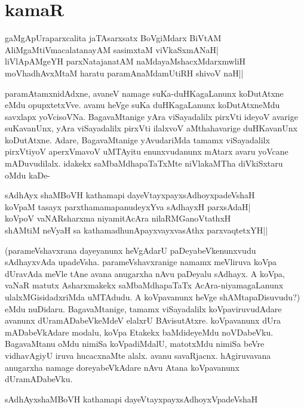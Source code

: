 \chapter{kamaR}\label{chap5}

\begin{shloka}
gaMgApUraparxcalita jaTAsarxsatx BoVgiMdarx BiVtAM\\
AliMgaMtiVmacalatanayAM sasimxtaM viVkaSxmANaH|\\
liVlApAMgeYH parxNatajanatAM naMdayaMshacxMdarxmwliH\\
moVhadhAvxMtaM haratu paramAnaMdamUtiRH shivoV naH||
\end{shloka}

paramAtamxnidAdxne, avaneV namage suKa-duHKagaLanunx koDutAtxne eMdu opupxtetxVve. avanu heVge suKa duHKagaLanunx koDutAtxneMdu savxlapx yoVcisoVNa. BagavaMtanige yAra viSayadalilx pirxVti ideyoV avarige suKavanUnx, yAra viSayadalilx pirxVti ilalxvoV aMthahavarige duHKavanUnx koDutAtxne. Adare, BagavaMtanige yAvudariMda tamamx viSayadalilx pirxVtiyoV aperxVmavoV uMTAyitu enunxvudanunx mAtarx avaru yoVcane mADuvudilalx. idakekx saMbaMdhapaTaTxMte niVlakaMTha diVkiSxtaru oMdu kaDe-

\begin{shloka}
sAdhAyx shaMBoVH kathamapi dayeVtayxpayxsAdhoyxpadeVshaH\\
koVpaM tasayx parxthamamapanudeyxYva sAdhayxH parxsAdaH|\\
koVpoV vaNARsharxma niyamitAcAra nilaRMGanoVtathxH\\
shAMtiM neVyaH sa kathamadhunApayxvayxvasAthx parxvaqtetxYH||
\end{shloka}

(parameVshavxrana dayeyanunx heVgAdarU paDeyabeVkenunxvudu sAdhayxvAda upadeVsha. parameVshavxranige namamx meVliruva koVpa dUravAda meVle tAne avana anugarxha nAvu paDeyalu sAdhayx. A koVpa, vaNaR matutx Asharxmakekx saMbaMdhapaTaTx AcAra-niyamagaLanunx ulalxMGisidadxriMda uMTAdudu. A koVpavanunx heVge shAMtapaDisuvudu?) eMdu nuDidaru. BagavaMtanige, tamamx viSayadalilx koVpaviruvudAdare avanunx dUramADabeVkeMdeV elalxrU BAvisutAtxre. koVpavanunx dUra mADabeVkAdare modalu, koVpa Etakekx baMdideyeMdu noVDabeVku. BagavaMtanu oMdu nimiSa koVpadiMdalU, matotxMdu nimiSa beVre vidhavAgiyU iruva hucacxnaMte alalx. avanu savaRjacnx. hAgiruvavana anugarxha namage doreyabeVkAdare nAvu Atana koVpavanunx dUramADabeVku.

\begin{shloka}
sAdhAyxshaMBoVH kathamapi dayeVtayxpayxsAdhoyxVpadeVshaH
\end{shloka}

